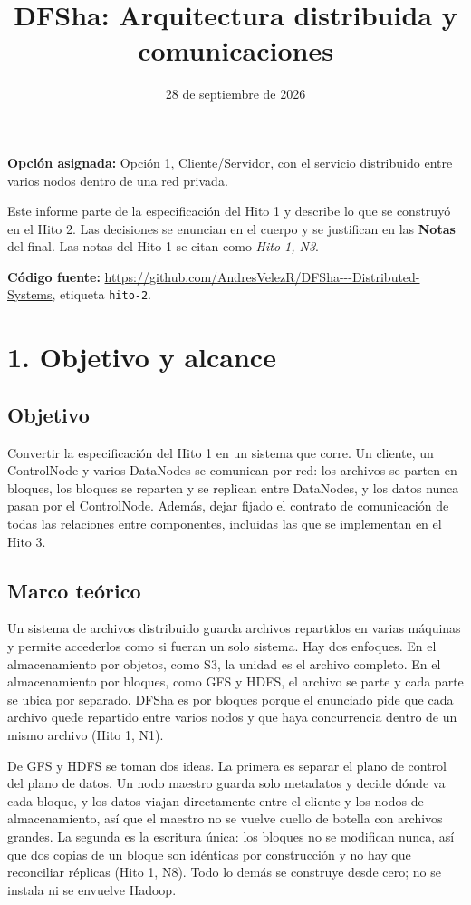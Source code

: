 \documentclass[10pt]{article}
\title{DFSha: Arquitectura distribuida y comunicaciones}
\date{28 de septiembre de 2026}
\begin{document}
\portada

\textbf{Opción asignada:} Opción 1, Cliente/Servidor, con el servicio distribuido entre varios nodos dentro de una red privada.

Este informe parte de la especificación del Hito 1 y describe lo que se construyó en el Hito 2. Las decisiones se enuncian en el cuerpo y se justifican en las \textbf{Notas} del final. Las notas del Hito 1 se citan como \emph{Hito 1, N3}.

\textbf{Código fuente:} \url{https://github.com/AndresVelezR/DFSha---Distributed-Systems}, etiqueta \texttt{hito-2}.

\separador

\section{1. Objetivo y alcance}

\subsection{Objetivo}

Convertir la especificación del Hito 1 en un sistema que corre. Un cliente, un ControlNode y varios DataNodes se comunican por red: los archivos se parten en bloques, los bloques se reparten y se replican entre DataNodes, y los datos nunca pasan por el ControlNode. Además, dejar fijado el contrato de comunicación de todas las relaciones entre componentes, incluidas las que se implementan en el Hito 3.

\subsection{Marco teórico}

Un sistema de archivos distribuido guarda archivos repartidos en varias máquinas y permite accederlos como si fueran un solo sistema. Hay dos enfoques. En el almacenamiento por objetos, como S3, la unidad es el archivo completo. En el almacenamiento por bloques, como GFS y HDFS, el archivo se parte y cada parte se ubica por separado. DFSha es por bloques porque el enunciado pide que cada archivo quede repartido entre varios nodos y que haya concurrencia dentro de un mismo archivo (Hito 1, N1).

De GFS y HDFS se toman dos ideas. La primera es separar el plano de control del plano de datos. Un nodo maestro guarda solo metadatos y decide dónde va cada bloque, y los datos viajan directamente entre el cliente y los nodos de almacenamiento, así que el maestro no se vuelve cuello de botella con archivos grandes. La segunda es la escritura única: los bloques no se modifican nunca, así que dos copias de un bloque son idénticas por construcción y no hay que reconciliar réplicas (Hito 1, N8). Todo lo demás se construye desde cero; no se instala ni se envuelve Hadoop.
\end{document}
